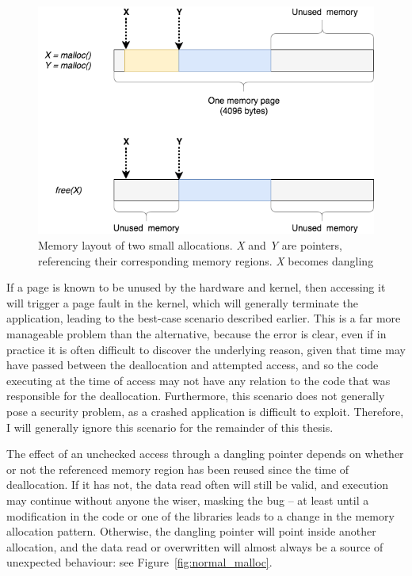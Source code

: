 \begin{figure}
    \centering
    \includegraphics[width=\textwidth]{diagrams/dangling_pointer_basics.png}
    \caption{Memory layout of two small allocations. \emph{X} and \emph{Y} are pointers, referencing their corresponding memory regions. \emph{X} becomes dangling}
    \label{fig:mem_two_small_allocs}
\end{figure}

If a page is known to be unused by the hardware and kernel, then accessing it will trigger a page fault in the kernel, which will generally terminate the application, leading to the best-case scenario described earlier. This is a far more manageable problem than the alternative, because the error is clear, even if in practice it is often difficult to discover the underlying reason, given that time may have passed between the deallocation and attempted access, and so the code executing at the time of access may not have any relation to the code that was responsible for the deallocation. Furthermore, this scenario does not generally pose a security problem, as a crashed application is difficult to exploit. Therefore, I will generally ignore this scenario for the remainder of this thesis.

The effect of an unchecked access through a dangling pointer depends on whether or not the referenced memory region has been reused since the time of deallocation. If it has not, the data read often will still be valid, and execution may continue without anyone the wiser, masking the bug -- at least until a modification in the code or one of the libraries leads to a change in the memory allocation pattern. Otherwise, the dangling pointer will point inside another allocation, and the data read or overwritten will almost always be a source of unexpected behaviour: see Figure~\ref{fig:normal_malloc}.

